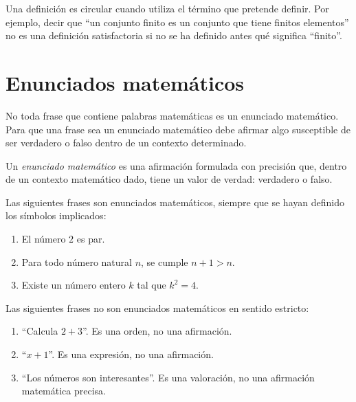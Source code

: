 \begin{advertencia}
Una definición es circular cuando utiliza el término que pretende definir. Por ejemplo, decir que ``un conjunto finito es un conjunto que tiene finitos elementos'' no es una definición satisfactoria si no se ha definido antes qué significa ``finito''.
\end{advertencia}

\section{Enunciados matemáticos}
\label{sec:enunciados-matematicos}

No toda frase que contiene palabras matemáticas es un enunciado matemático. Para que una frase sea un enunciado matemático debe afirmar algo susceptible de ser verdadero o falso dentro de un contexto determinado.

\begin{definicion}
Un \emph{enunciado matemático} es una afirmación formulada con precisión que, dentro de un contexto matemático dado, tiene un valor de verdad: verdadero o falso.
\end{definicion}

\begin{ejemplo}
Las siguientes frases son enunciados matemáticos, siempre que se hayan definido los símbolos implicados:
\begin{enumerate}
  \item El número \(2\) es par.
  \item Para todo número natural \(n\), se cumple \(n+1>n\).
  \item Existe un número entero \(k\) tal que \(k^2=4\).
\end{enumerate}
\end{ejemplo}

\begin{ejemplo}
Las siguientes frases no son enunciados matemáticos en sentido estricto:
\begin{enumerate}
  \item ``Calcula \(2+3\)''. Es una orden, no una afirmación.
  \item ``\(x+1\)''. Es una expresión, no una afirmación.
  \item ``Los números son interesantes''. Es una valoración, no una afirmación matemática precisa.
\end{enumerate}
\end{ejemplo}

